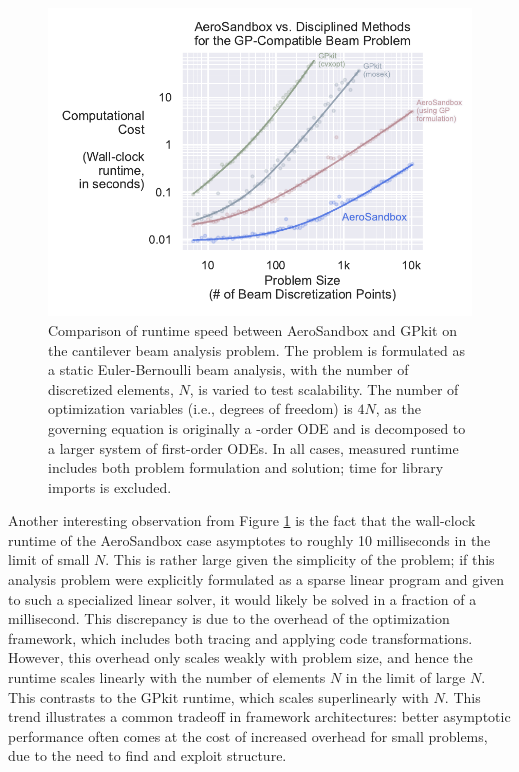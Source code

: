 \begin{figure}[h]
    \centering
    \includegraphics[width=\textwidth]{../figures/benchmark_gp_beam.pdf}
    \caption{Comparison of runtime speed between AeroSandbox and GPkit on the cantilever beam analysis problem. The problem is formulated as a static Euler-Bernoulli beam analysis, with the number of discretized elements, $N$, is varied to test scalability. The number of optimization variables (i.e., degrees of freedom) is $4N$, as the governing equation is originally a -order ODE and is decomposed to a larger system of first-order ODEs. In all cases, measured runtime includes both problem formulation and solution; time for library imports is excluded.}
    \label{fig:benchmark_gp_beam}
\end{figure}

Another interesting observation from Figure \ref{fig:benchmark_gp_beam} is the fact that the wall-clock runtime of the AeroSandbox case asymptotes to roughly 10 milliseconds in the limit of small $N$. This is rather large given the simplicity of the problem; if this analysis problem were explicitly formulated as a sparse linear program and given to such a specialized linear solver, it would likely be solved in a fraction of a millisecond. This discrepancy is due to the overhead of the optimization framework, which includes both tracing and applying code transformations. However, this overhead only scales weakly with problem size, and hence the runtime scales linearly with the number of elements $N$ in the limit of large $N$. This contrasts to the GPkit runtime, which scales superlinearly with $N$. This trend illustrates a common tradeoff in framework architectures: better asymptotic performance often comes at the cost of increased overhead for small problems, due to the need to find and exploit structure.

